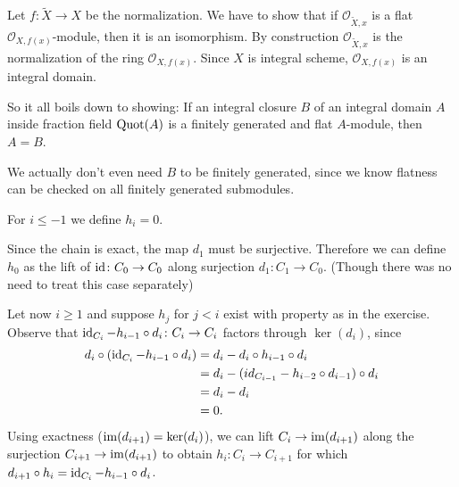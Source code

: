 \newcommand{\sheet}{2}




\maketitle{}

\begin{exercise}{2}
    Let $f \colon \tilde{X} \to X$ be the normalization.
    We have to show that if $\mathcal{O}_{\tilde{X}, x}$ is a flat
    $\mathcal{O}_{X, f(x)}$-module, then it is an isomorphism.
    By construction $\mathcal{O}_{\tilde{X}, x}$ is the normalization of the ring
    $\mathcal{O}_{X, f(x)}$.
    Since $X$ is integral scheme, $\mathcal{O}_{X, f(x)}$ is an integral domain.
    
    So it all boils down to showing:
    If an integral closure $B$ of an integral domain $A$ inside fraction field
    $\operatorname{Quot}(A)$ is a finitely generated and flat $A$-module, then $A = B$.

    We actually don't even need $B$ to be finitely generated, since we know
    flatness can be checked on all finitely generated submodules.
\end{exercise}

\begin{exercise}{4}
    For $i \leq -1$ we define $h_i = 0$.

    Since the chain is exact, the map $d_1$ must be surjective. Therefore we can
    define $h_0$ as the lift of $\operatorname{id} \colon C_0 \to C_0$ along surjection $d_1
    \colon C_1 \to C_0$. (Though there was no need to treat this case separately)

    Let now $i \geq 1$ and suppose $h_j$ for $j < i$ exist with property as in the exercise.
    Observe that $\operatorname{id}_{C_i} - h_{i-1} \circ d_i \colon C_i \to C_i$ factors
    through $\ker(d_i)$, since
    \begin{equation*}
        \begin{split}
            d_i \circ (\operatorname{id}_{C_i} - h_{i-1} \circ d_i) &= d_i - d_i \circ h_{i-1}
            \circ d_i \\
            &= d_i - (id_{C_{i-1}} - h_{i-2} \circ d_{i-1}) \circ d_i \\
            &= d_i - d_i \\
            &= 0.
        \end{split}
    \end{equation*}
    Using exactness ($\operatorname{im}(d_{i+1}) = \ker(d_i)$), we can lift $C_i \to
    \operatorname{im}(d_{i+1})$ along the surjection $C_{i+1} \to \operatorname{im}(d_{i+1})$ to obtain $h_i
    \colon C_i \to C_{i+1}$ for which $d_{i+1} \circ h_i = \operatorname{id}_{C_i} - h_{i-1}
    \circ d_i$.
\end{exercise}


